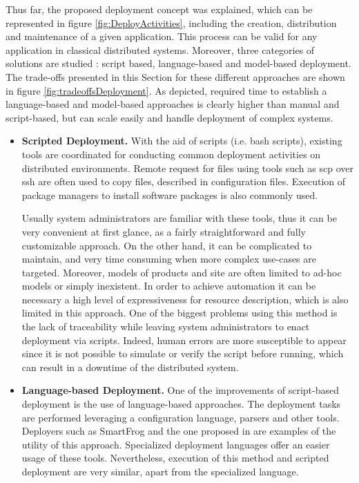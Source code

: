 Thus far, the proposed deployment concept was explained, which can be represented in figure \ref{fig:DeployActivities}, including the creation, distribution and maintenance of a given application.
This process can be valid for any application in classical distributed systems.
Moreover, three categories of solutions are studied \cite{talwar2005approaches}: script based, language-based and model-based deployment.
The trade-offs presented in this Section for these different approaches are shown in figure \ref{fig:tradeoffsDeployment}.
As depicted, required time to establish a language-based and model-based approaches is clearly higher than manual and script-based, but can scale easily and handle deployment of complex systems.
\begin{itemize}
	\item \textbf{Scripted Deployment.} With the aid of scripts (i.e. bash scripts), existing tools are coordinated for conducting common deployment activities on distributed environments.
	Remote request for files using tools such as scp over ssh are often used to copy files, described in configuration files.
	Execution of package managers to install software packages is also commonly used.
	
	Usually system administrators are familiar with these tools, thus it can be very convenient at first glance, as a fairly straightforward and fully customizable approach.
	On the other hand, it can be complicated to maintain, and very time consuming when more complex use-cases are targeted.
	Moreover, models of products and site are often limited to ad-hoc models or simply inexistent.
	In order to achieve automation it can be necessary a high level of expressiveness for resource description, which is also limited in this approach.
	One of the biggest problems using this method is the lack of traceability while leaving system administrators to enact deployment via scripts.
	Indeed, human errors are more susceptible to appear since it is not possible to simulate or verify the script before running, which can result in a downtime of the distributed system.
	
	\item \textbf{Language-based Deployment.} One of the improvements of script-based deployment is the use of language-based approaches.
	The deployment tasks are performed leveraging a configuration language, parsers and other tools.
	Deployers such as SmartFrog \cite{goldsack2003smartfrog} and the one proposed in   \cite{wang2006language} are examples of the utility of this approach.
	Specialized deployment languages offer an easier usage of these tools.
	Nevertheless, execution of this method and scripted deployment are very similar, apart from the specialized language.
	

\end{itemize}
